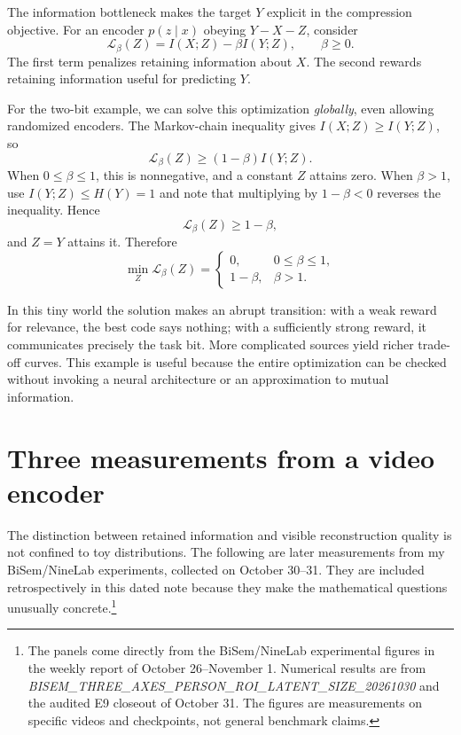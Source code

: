 The information bottleneck makes the target \(Y\) explicit in the compression objective. For an encoder \(p(z\mid x)\) obeying \(Y-X-Z\), consider
\begin{equation}
 \mathcal L_\beta(Z)
 =I(X;Z)-\beta I(Y;Z),
 \qquad\beta\geq0.
 \label{eq:N20261009-IB}
\end{equation}
The first term penalizes retaining information about \(X\). The second rewards retaining information useful for predicting \(Y\).

For the two-bit example, we can solve this optimization \emph{globally}, even allowing randomized encoders. The Markov-chain inequality gives \(I(X;Z)\geq I(Y;Z)\), so
\[
 \mathcal L_\beta(Z)\geq(1-\beta)I(Y;Z).
\]
When \(0\leq\beta\leq1\), this is nonnegative, and a constant \(Z\) attains zero. When \(\beta>1\), use \(I(Y;Z)\leq H(Y)=1\) and note that multiplying by \(1-\beta<0\) reverses the inequality. Hence
\[
 \mathcal L_\beta(Z)\geq1-\beta,
\]
and \(Z=Y\) attains it. Therefore
\begin{equation}
 \boxed{\min_Z\mathcal L_\beta(Z)=
 \begin{cases}
 0,&0\leq\beta\leq1,\\
 1-\beta,&\beta>1.
 \end{cases}}
 \label{eq:N20261009-IBopt}
\end{equation}

In this tiny world the solution makes an abrupt transition: with a weak reward for relevance, the best code says nothing; with a sufficiently strong reward, it communicates precisely the task bit. More complicated sources yield richer trade-off curves. This example is useful because the entire optimization can be checked without invoking a neural architecture or an approximation to mutual information.

\section{Three measurements from a video encoder}

The distinction between retained information and visible reconstruction quality is not confined to toy distributions. The following are later measurements from my BiSem/NineLab experiments, collected on October 30--31. They are included retrospectively in this dated note because they make the mathematical questions unusually concrete.\footnote{The panels come directly from the BiSem/NineLab experimental figures in the weekly report of October 26--November 1. Numerical results are from \emph{BISEM\_THREE\_AXES\_PERSON\_ROI\_LATENT\_SIZE\_20261030} and the audited E9 closeout of October 31. The figures are measurements on specific videos and checkpoints, not general benchmark claims.}

